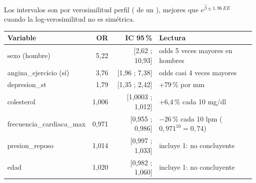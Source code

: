 Los intervalos son por verosimilitud perfil ( de un ), mejores que $e^{\hat\beta\pm1,96\,EE}$
cuando la log-verosimilitud no es simétrica.
\begin{center}\small
\begin{tabular}{lrrl}
\toprule
Variable & OR & IC 95\,\% & Lectura \\ \midrule
sexo (hombre) & 5,22 & [2,62 ; 10,93] & odds 5 veces mayores en hombres \\
angina\_ejercicio (sí) & 3,76 & [1,96 ; 7,38] & odds casi 4 veces mayores \\
depresion\_st & 1,79 & [1,35 ; 2,42] & +79\,\% por mm \\
colesterol & 1,006 & [1,0003 ; 1,012] & +6,4\,\% cada 10 mg/dl \\
frecuencia\_cardiaca\_max & 0,971 & [0,955 ; 0,986] & $-26$\,\% cada 10 lpm ($0,971^{10}=0,74$) \\
presion\_reposo & 1,014 & [0,997 ; 1,033] & incluye 1: no concluyente \\
edad & 1,020 & [0,982 ; 1,060] & incluye 1: no concluyente \\ \bottomrule
\end{tabular}
\end{center}


